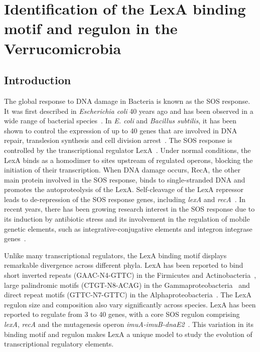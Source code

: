 \chapter{Identification of the LexA binding motif and regulon in the
  Verrucomicrobia}

\section{Introduction}

The global response to DNA damage in Bacteria is known as the SOS response. It
was first described in \textit{Escherichia coli} 40 years ago and has been
observed in a wide range of bacterial species~\citep{radman1975sos,
  little1982sos, erill2007aeons}. In \textit{E. coli} and \textit{Bacillus
  subtilis}, it has been shown to control the expression of up to 40 genes that
are involved in DNA repair, translesion synthesis and cell division
arrest~\citep{au2005genetic, fernandez2000identification, walker2000sos}. The
SOS response is controlled by the transcriptional regulator
LexA~\citep{michel2005after}. Under normal conditions, the LexA binds as a
homodimer to sites upstream of regulated operons, blocking the initiation of
their transcription. When DNA damage occurs, RecA, the other main protein
involved in the SOS response, binds to single-stranded DNA and promotes the
autoproteolysis of the LexA. Self-cleavage of the LexA repressor leads to
de-repression of the SOS response genes, including \textit{lexA} and
\textit{recA}~\citep{little1991mechanism}. In recent years, there has been
growing research interest in the SOS response due to its induction by antibiotic stress
and its involvement in the regulation of mobile genetic elements, such as
integrative-conjugative elements and integron integrase genes~\citep{beaber2004sos,
  guerin2009sos}.

Unlike many transcriptional regulators, the LexA binding motif displays remarkable
divergence across different phyla. LexA has been reported to bind short
inverted repeats (GAAC-N4-GTTC) in the Firmicutes and
Actinobacteria~\citep{au2005genetic, davis2002definition}, large palindromic
motifs (CTGT-N8-ACAG) in the Gammaproteobacteria~\citep{erill2003silico,
  fernandez2000identification} and direct repeat motifs (GTTC-N7-GTTC) in the
Alphaproteobacteria~\citep{erill2004differences,
  fernandez1998identification}. The LexA regulon size and composition also vary
significantly across species. LexA has been reported to regulate from 3 to 40
genes, with a core SOS regulon comprising \textit{lexA}, \textit{recA} and the
mutagenesis operon \textit{imuA-imuB-dnaE2}~\citep{erill2006dispersal}. This
variation in its binding motif and
regulon makes LexA a unique model to study the evolution of transcriptional
regulatory elements.


